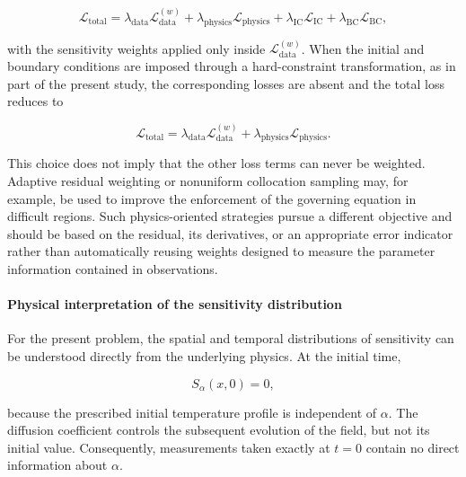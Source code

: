 \begin{equation}
\mathcal{L}_{\mathrm{total}}
=
\lambda_{\mathrm{data}}
\mathcal{L}_{\mathrm{data}}^{(w)}
+
\lambda_{\mathrm{physics}}
\mathcal{L}_{\mathrm{physics}}
+
\lambda_{\mathrm{IC}}
\mathcal{L}_{\mathrm{IC}}
+
\lambda_{\mathrm{BC}}
\mathcal{L}_{\mathrm{BC}},
\end{equation}

with the sensitivity weights applied only inside
$\mathcal{L}_{\mathrm{data}}^{(w)}$. When the initial and boundary conditions are
imposed through a hard-constraint transformation, as in part of the present
study, the corresponding losses are absent and the total loss reduces to

\begin{equation}
\mathcal{L}_{\mathrm{total}}
=
\lambda_{\mathrm{data}}
\mathcal{L}_{\mathrm{data}}^{(w)}
+
\lambda_{\mathrm{physics}}
\mathcal{L}_{\mathrm{physics}}.
\end{equation}

This choice does not imply that the other loss terms can never be weighted.
Adaptive residual weighting or nonuniform collocation sampling may, for example,
be used to improve the enforcement of the governing equation in difficult
regions. Such physics-oriented strategies pursue a different objective and
should be based on the residual, its derivatives, or an appropriate error
indicator rather than automatically reusing weights designed to measure the
parameter information contained in observations.

\paragraph{Physical interpretation of the sensitivity distribution}

For the present problem, the spatial and temporal distributions of sensitivity
can be understood directly from the underlying physics. At the initial time,

\begin{equation}
S_{\alpha}(x,0)=0,
\end{equation}

because the prescribed initial temperature profile is independent of $\alpha$.
The diffusion coefficient controls the subsequent evolution of the field, but not
its initial value. Consequently, measurements taken exactly at $t=0$ contain no
direct information about $\alpha$.

